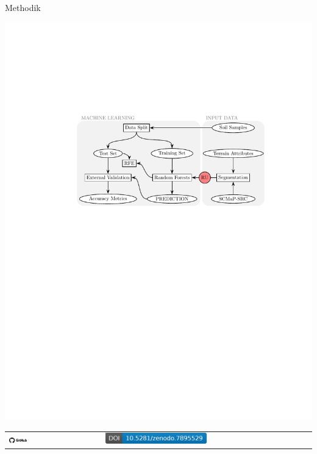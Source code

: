 \begin{frame}{Methodik}
\begin{block}{}
\centering\includegraphics[width=1\textwidth]{FIGURE/Figure_workflow.pdf}
\end{block}
\begin{tabular}{ll}
\href{https://github.com/FLFgit/ScaleP/wiki}{\centering\includegraphics[width=0.2\textwidth]{FIGURE/Github.png}} &
\href{https://zenodo.org/record/7895529}{\centering\includegraphics[width=0.5\textwidth]{FIGURE/Zenodo.png}}\\
\end{tabular}
\end{frame}


